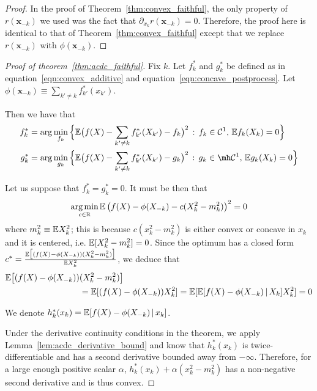 \begin{proof}
  In the proof of Theorem~\ref{thm:convex_faithful}, the only property
  of $r(\mathbf{x}_{-k})$ we used was the fact that $\partial_{x_k}
  r(\mathbf{x}_{-k}) = 0$. Therefore, the proof here is identical to
  that of Theorem~\ref{thm:convex_faithful} except that we replace $r(\mathbf{x}_{-k})$ with $\phi(\mathbf{x}_{-k})$.
\end{proof}


\begin{proof}[Proof of theorem~\ref{thm:acdc_faithful}]

Fix $k$. Let $f^*_k$ and $g^*_k$ be defined as in
equation~\ref{eqn:convex_additive} and
equation~\ref{eqn:concave_postprocess}. Let $\phi(\mathbf{x}_{-k}) \equiv \sum_{k' \neq k} f^*_{k'}(x_{k'})$.

Then we have that
\begin{align}
f^*_k &= \arg\min_{f_k} \Big\{
   \E\big( f(X) - \sum_{k' \neq k} f^*_{k'}(X_{k'}) - f_k \big)^2 
    \,:\, f_k \in  \mathcal{C}^1,\, \E f_k(X_k) = 0 
  \Big\} \\
g^*_k &= \arg\min_{g_k} \Big\{
   \E\big( f(X) - \sum_{k' \neq k} f^*_{k'}(X_{k'}) - g_k \big)^2 
    \,:\, g_k \in \mh \mathcal{C}^1,\, \E g_k(X_k) = 0 
  \Big\}
\end{align}

Let us suppose that $f^*_k = g^*_k = 0$. It must be then that
\begin{align*}
\mathop{\text{\rm arg\,min}}_{c \in {\mathbb R}} {\mathbb E} \left( f(X) - \phi(X_{-k}) - c (X_k^2 - m_k^2) \right)^2 = 0
\end{align*}
where $m_k^2 \equiv {\mathbb E} X_k^2$; this is because $c(x_k^2 - m_k^2)$ is either convex or concave in $x_k$ and it is centered, i.e. ${\mathbb E}[ X_k^2 - m_k^2] = 0$. Since the optimum has a closed form $c^* = \frac{{\mathbb E}\big[(f(X) -\phi(X_{-k}))(X_k^2 - m^2_k)\big]}{{\mathbb E} X_k^2}$, we deduce that 
\begin{align*}
{\mathbb E} \big[ (f(X) - \phi(X_{-k})) &(X_k^2 - m_k^2) \big] \\
   &= {\mathbb E}[ (f(X) - \phi(X_{-k})) X^2_k] = 
 {\mathbb E}[ {\mathbb E}[ f(X) - \phi(X_{-k}) {\,|\,} X_k] X^2_k] = 0
\end{align*}

We denote $h^*_k(x_k) = {\mathbb E}[ f(X) - \phi(X_{-k}) {\,|\,} x_k]$.

Under the derivative continuity conditions in the theorem, we apply Lemma~\ref{lem:acdc_derivative_bound} and know that $h^*_k(x_k)$ is twice-differentiable and has a second derivative bounded away from $-\infty$. Therefore, for a large enough positive scalar $\alpha$, $h^*_k(x_k) + \alpha(x_k^2 - m_k^2)$ has a non-negative second derivative and is thus convex.


\end{proof}
